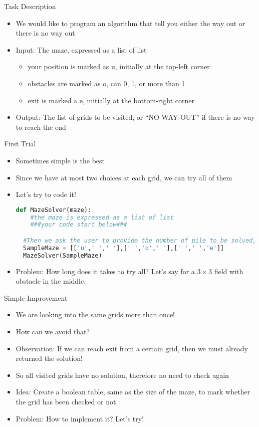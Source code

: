\documentclass[10pt,xcolor={table,dvipsnames},t]{beamer}
\begin{document}
\begin{frame}{Task Description}
\begin{itemize}
\item We would like to program an algorithm that tell you either the way out or there is no way out
\item Input: The maze, expressed as a list of list
\begin{itemize}
  \item your position is marked as u, initially at the top-left corner
  \item obstacles are marked as o, can 0, 1, or more than 1
  \item exit is marked a e, initially at the bottom-right corner
\end{itemize}
\item Output: The list of grids to be visited, or ``NO WAY OUT'' if there is no way to reach the end
\end{itemize}
\end{frame}

\begin{frame}[fragile]{First Trial}
\begin{itemize}
\item Sometimes simple is the best
\item Since we have at most two choices at each grid, we can try all of them
\item Let's try to code it!
\begin{lstlisting}[language=python]
  def MazeSolver(maze):
    #the maze is expressed as a list of list
    ###your code start below###

  #Then we ask the user to provide the number of pile to be solved, and call the function we just implemented.
  SampleMaze = [['u',' ',' '],[' ','o',' '],[' ',' ','e']]
  MazeSolver(SampleMaze)
\end{lstlisting}
\item Problem: How long does it takes to try all? Let's say for a $3\times 3$ field with obstacle in the middle.
\end{itemize}
\end{frame}

\begin{frame}{Simple Improvement}
  \begin{itemize}
    \item We are looking into the same grids more than once!
    \item How can we avoid that?
    \item Observation: If we can reach exit from a certain grid, then we must already returned the solution!
    \item So all visited grids have no solution, therefore no need to check again
    \item Idea: Create a boolean table, same as the size of the maze, to mark whether the grid has been checked or not
    \item Problem: How to implement it? Let's try!
  \end{itemize}
\end{frame}
\end{document}
